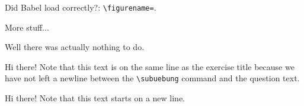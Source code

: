 \documentclass[11pt,a4paper]{article}
\begin{document}
Did Babel load correctly?: \texttt{\textbackslash figurename=}\figurename.




More stuff...

\begin{solution}
  Well there was actually nothing to do.
\end{solution}


Hi there! Note that this text is on the same line as the exercise title because we have
not left a newline between the \texttt{\textbackslash subuebung} command and the question
text.


Hi there! Note that this text starts on a new line.
\end{document}
